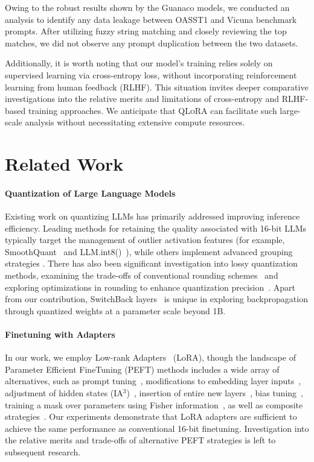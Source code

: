 Owing to the robust results shown by the {Guanaco} models, we conducted an analysis to identify any data leakage between OASST1 and Vicuna benchmark prompts. After utilizing fuzzy string matching and closely reviewing the top matches, we did not observe any prompt duplication between the two datasets.

Additionally, it is worth noting that our model’s training relies solely on supervised learning via cross-entropy loss, without incorporating reinforcement learning from human feedback (RLHF). This situation invites deeper comparative investigations into the relative merits and limitations of cross-entropy and RLHF-based training approaches. We anticipate that \textsc{QLoRA} can facilitate such large-scale analysis without necessitating extensive compute resources.

\section{Related Work}

\paragraph{Quantization of Large Language Models} Existing work on quantizing LLMs has primarily addressed improving inference efficiency. Leading methods for retaining the quality associated with 16-bit LLMs typically target the management of outlier activation features (for example, SmoothQuant~\citep{xiao2022smoothquant} and LLM.int8()~\citep{dettmers2022llm}), while others implement advanced grouping strategies \citep{park2022nuqmm, yao2022zeroquant}. There has also been significant investigation into lossy quantization methods, examining the trade-offs of conventional rounding schemes~\citep{dettmers2022case,zeng2022glm,pope2022efficiently} and exploring optimizations in rounding to enhance quantization precision~\citep{frantar2022gptq}. Apart from our contribution, SwitchBack layers~\citep{wortsman2023stable} is unique in exploring backpropagation through quantized weights at a parameter scale beyond 1B.

\paragraph{Finetuning with Adapters} In our work, we employ Low-rank Adapters~\citep{hu2021lora} (LoRA), though the landscape of Parameter Efficient FineTuning (PEFT) methods includes a wide array of alternatives, such as prompt tuning~\citep{qin2021learning,lester2021power,li2021prefix}, modifications to embedding layer inputs~\citep{an2022input}, adjustment of hidden states (IA$^3$)~\citep{liu2022few}, insertion of entire new layers~\citep{houlsby2019parameter}, bias tuning~\citep{zaken2021bitfit}, training a mask over parameters using Fisher information~\citep{sung2021training}, as well as composite strategies~\citep{henderson2021compacter}. Our experiments demonstrate that LoRA adapters are sufficient to achieve the same performance as conventional 16-bit finetuning. Investigation into the relative merits and trade-offs of alternative PEFT strategies is left to subsequent research.

